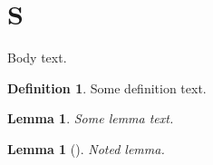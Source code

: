 \documentclass{acmart}
\theoremstyle{plain}
\newtheorem{lemma}[theorem]{Lemma}
\theoremstyle{definition}
\newtheorem{definition}[theorem]{Definition}
\begin{document}
\section{S}
Body text.
\begin{definition}\label{def:a} Some definition text.
\end{definition}

\begin{lemma}\label{lem:a} Some lemma text.
\end{lemma}

\begin{lemma}[{{\cite[Lemma~3.1]{key}}}]\label{lem:b} Noted lemma.
\end{lemma}
\end{document}
